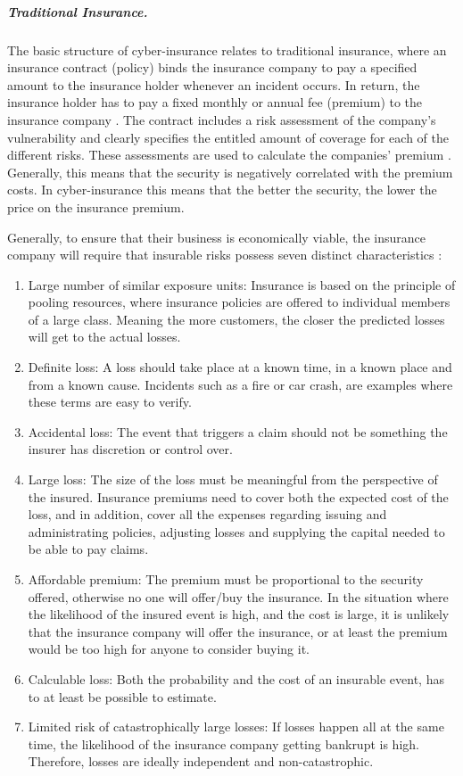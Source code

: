 \subparagraph{Traditional Insurance.} 
The basic structure of cyber-insurance relates to traditional insurance, where an insurance contract (policy) binds the insurance company to pay a specified amount to the insurance holder whenever an incident occurs. In return, the insurance holder has to pay a fixed monthly or annual fee (premium) to the insurance company \cite{robinson2012incentives}. The contract includes a risk assessment of the company's vulnerability and clearly specifies the entitled amount of coverage for each of the different risks. These assessments are used to calculate the companies' premium \cite{robinson2012incentives}. Generally, this means that the security is negatively correlated with the premium costs. In cyber-insurance this means that the better the security, the lower the price on the insurance premium.
   
Generally, to ensure that their business is economically viable, the insurance company will require that insurable risks possess seven distinct characteristics \cite{mehr1980principles}: 
   \begin{enumerate}
   \item Large number of similar exposure units: Insurance is based on the principle of pooling resources, where insurance policies are offered to individual members of a large class. Meaning the more customers, the closer the predicted losses will get to the actual losses.
   \item Definite loss: A loss should take place at a known time, in a known place and from a known
    cause. Incidents such as a fire or car crash, are examples where these terms are easy to verify.
   \item Accidental loss: The event that triggers a claim should not be 
   something the insurer has discretion or control over.
   \item Large loss: The size of the loss must be meaningful from the perspective of the insured.
    Insurance premiums need to cover both the expected cost of the loss, and in addition, 
    cover all the expenses regarding issuing and administrating policies, adjusting losses and
     supplying the capital needed to be able to pay claims.
   \item Affordable premium: The premium must be proportional to the security offered, otherwise no
    one will offer/buy the insurance. In the situation where the likelihood of the insured event is
     high, and the cost is large, it is unlikely that the insurance company will offer the insurance,
      or at least the premium would be too high for anyone to consider buying it. 
   \item Calculable loss: Both the probability and the cost of an insurable event,
    has to at least be possible to estimate. 
   \item Limited risk of catastrophically large losses: If losses happen all at the same time, the likelihood of
    the insurance company getting bankrupt is high. Therefore, losses are ideally independent and non-catastrophic. 
   \end{enumerate}
   
